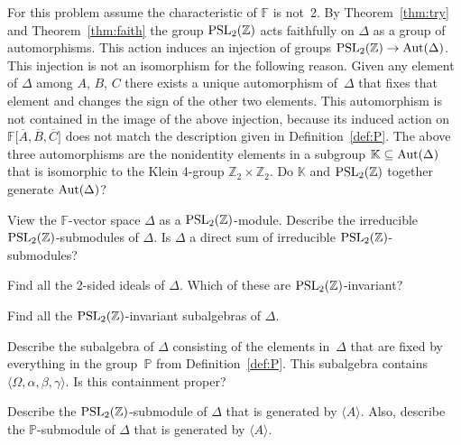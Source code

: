 \documentclass[pdftex]{sigma}
\numberwithin{equation}{section}
\begin{document}
\begin{Problem}
For this problem assume the characteristic of $\mathbb F$ is not~2.
By
Theorem~\ref{thm:try}
and Theorem~\ref{thm:faith} the group
${\rm  {PSL}}_2(\mathbb Z)$ acts faithfully on
$\Delta $ as a group of
automorphisms. This action induces an
injection of groups
${\rm  {PSL}}_2(\mathbb Z) \to {\rm Aut}(\Delta)$.
This injection is not an isomorphism
for the following reason.
Given any element of $\Delta$ among
$A$, $B$, $C$
there exists a unique automorphism of~$\Delta$
that f\/ixes that element and changes the sign of
the other two elements.
This automorphism is not contained in
the image of the above injection, because
its induced action on
$\mathbb F \lbrack  \overline A,\overline B,\overline C\rbrack$
does not match the description given in
Def\/inition~\ref{def:P}.
The above three automorphisms
are the nonidentity elements in
a subgroup $\mathbb K
\subseteq {\rm Aut}(\Delta)$ that is isomorphic
to the Klein 4-group $\mathbb Z_2 \times \mathbb Z_2$.
Do $\mathbb K$ and
${\rm  {PSL}}_2(\mathbb Z)$ together generate
${\rm Aut}(\Delta)$?
\end{Problem}

\begin{Problem}
View the $\mathbb F$-vector space $\Delta$ as a
${\rm  {PSL}}_2(\mathbb Z)$-module.  Describe the
irreducible
${\rm  {PSL}}_2(\mathbb Z)$-submodules of $\Delta$.
Is $\Delta $ a direct sum of irreducible
${\rm  {PSL}}_2(\mathbb Z)$-submodules?
\end{Problem}

\begin{Problem}
Find all the 2-sided ideals of $\Delta$.
Which of these are
${\rm  {PSL}}_2(\mathbb Z)$-invariant?
\end{Problem}

\begin{Problem}
Find all the
${\rm  {PSL}}_2(\mathbb Z)$-invariant subalgebras of
$\Delta$.
\end{Problem}


\begin{Problem}
\label{prob:pp}
Describe the subalgebra of
$\Delta $ consisting of the elements
in~$\Delta$ that are f\/ixed by everything in
the group~$\mathbb P$ from
Def\/inition~\ref{def:P}.
This subalgebra contains $\langle \Omega,\alpha,\beta,\gamma\rangle$.
Is this containment proper?
\end{Problem}


\begin{Problem}
Describe the
${\rm  {PSL}}_2(\mathbb Z)$-submodule of $\Delta$
that is generated by $\langle A \rangle $.
Also,
describe the $\mathbb P$-submodule of
 $\Delta$
that is generated by $\langle A \rangle $.
\end{Problem}
\end{document}
